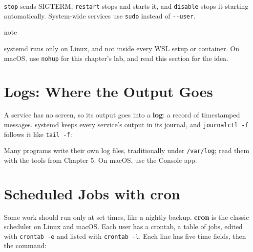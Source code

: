 \texttt{stop} sends SIGTERM, \texttt{restart} stops and starts it, and \texttt{disable} stops it starting automatically. System-wide services use \texttt{sudo} instead of \texttt{-\/-user}.

\begin{callout}{note}

systemd runs only on Linux, and not inside every WSL setup or container. On macOS, use \texttt{nohup} for this chapter's lab, and read this section for the idea.

\end{callout}


\section{Logs: Where the Output Goes}\label{06-programs-that-keep-running:logs-where-the-output-goes}

A service has no screen, so its output goes into a \textbf{log}: a record of timestamped messages. systemd keeps every service's output in its journal, and \texttt{journalctl\ -f} follows it like \texttt{tail\ -f}:

\begin{codeblock}

\begin{Shaded}
\begin{Highlighting}[]
  
\end{Highlighting}
\end{Shaded}

\end{codeblock}

Many programs write their own log files, traditionally under \texttt{/var/log}; read them with the tools from Chapter 5. On macOS, use the Console app.

\section{Scheduled Jobs with cron}\label{06-programs-that-keep-running:scheduled-jobs-with-cron}

Some work should run only at set times, like a nightly backup. \textbf{cron} is the classic scheduler on Linux and macOS. Each user has a crontab, a table of jobs, edited with \texttt{crontab\ -e} and listed with \texttt{crontab\ -l}. Each line has five time fields, then the command:

